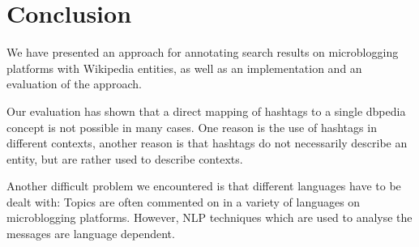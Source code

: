 \documentclass{llncs}
\begin{document}
\section{Conclusion}
\label{sect:conclusion}

We have presented an approach for annotating search results on microblogging platforms with Wikipedia entities, as well as an implementation and an evaluation of the approach.

Our evaluation has shown that a direct mapping of hashtags to a single dbpedia concept is not possible in many cases. One reason is the use of hashtags in different contexts, another reason is that hashtags do not necessarily describe an entity, but are rather used to describe contexts.

Another difficult problem we encountered is that different languages have to be dealt with: Topics are often commented on in a variety of languages on microblogging platforms. However, NLP techniques which are used to analyse the messages are language dependent.




\end{document}
